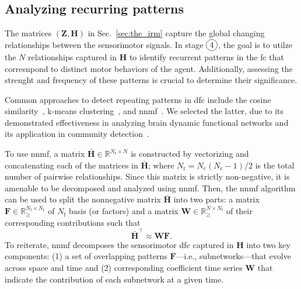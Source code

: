 \subsection{Analyzing recurring patterns}
The matrices $(\bm{Z}, \bm{H})$ in Sec.~\ref{sec:the_irm} capture the global changing relationships between the sensorimotor signals. In stage $\circled{4}$, the goal is to utilze the $N$ relationships captured in $\bm{H}$ to identify recurrent patterns in the \ac{fc} that corresnpond to distinct motor behaviors of the agent. Additionally, assessing the strenght and frequency of these patterns is crucial to determine their significance. 

Common approaches to detect repeating patterns in \ac{dfc} include the cosine similarity~\cite{Menon2019comparisonstaticdynamic}, k-means clustering~\cite{Li2017Hightransitionfrequencies}, and  \ac{nnmf}~\cite{Fu2019Nonnegativematrixfactorization}. We selected the latter, due to its demonstrated  effectiveness in analyzing brain dynamic functional networks and its application in community  detection~\cite{Wang2011Communitydiscoveryusing,Luo2021Symmetricnonnegativematrix}.

To use \ac{nnmf}, a matrix $\bar{\bm{H}}\in \mathbb{R}^{N_\text{r}\times N}$ is constructed by vectorizing  and concatenating each of the matrices in $\bar{\bm{H}}$; where $N_\text{r} = N_\text{c}(N_\text{c}-1)/2$ is the total number of pairwise relationships. Since this matrix is strictly non-negative, it is amenable to be decomposed and analyzed using \ac{nnmf}. Then, the \ac{nnmf} algorithm can be used to split the nonnegative matrix $\bar{\bm{H}}$ into two parts: a matrix $\bm{F} \in \mathbb{R}^{N_\text{f}\times N_\text{r}}_{\geq}$ of $N_\text{f}$ basis (or factors) and a matrix $\bm{W} \in \mathbb{R}^{N\times N_\text{f}}_{\geq}$ of their corresponding contributions such that
\begin{equation}
	\bar{\bm{H}}^\intercal \approx \bm{W} \bm{F}.
\end{equation}
To reiterate, \ac{nnmf} decomposes the sensorimotor \ac{dfc} captured in $\bm{H}$ into two key components: (1) a set of overlapping patterns $\bm{F}$---i.e., subnetworks---that evolve across space and time and (2) corresponding coefficient time series $\bm{W}$ that indicate the contribution of each subnetwork at a given time.

